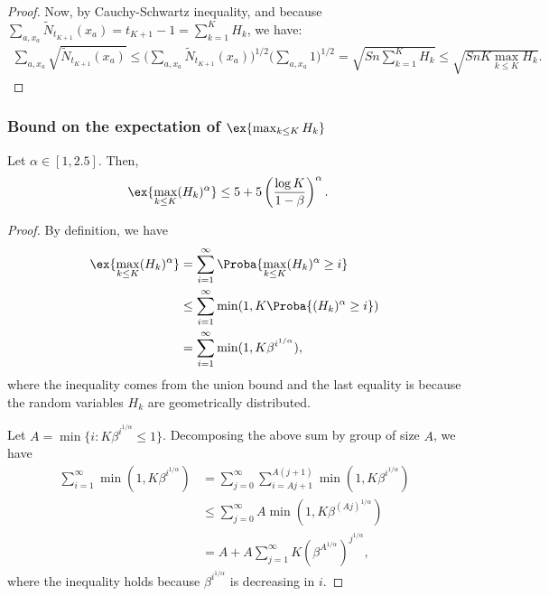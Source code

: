 \begin{subappendices}
\begin{proof}
Now, by Cauchy-Schwartz inequality, and because $\sum_{a,x_a}\tilde{N}_{t_{K+1}}(x_a) =t_{K+1}-1 {=}\sum_{k=1}^{K}H_k$, we have:
\begin{align*}
    \sum_{a,x_a}\sqrt{\tilde{N}_{t_{K+1}}(x_a)} \le \Big(\sum_{a,x_a}\tilde{N}_{t_{K+1}}(x_a)\Big)^{1/2}\Big(\sum_{a,x_a}1\Big)^{1/2}=\sqrt{Sn\sum_{k=1}^{K}H_k}\le \sqrt{SnK \max_{k\le K}H_k}.
\end{align*}
\end{proof}

\subsubsection{Bound on the expectation of $\ex{\max_{k\le K}H_k}$}

\begin{lem}
    \label{lem:moment}
    Let $\alpha\in[1,2.5]$. Then,
    \begin{align}
        \label{eq:lemma_HK}
        \ex{\max_{k\le K}(H_k)^\alpha} &\le 5+5\left(\frac{\log K}{1-\beta}\right)^\alpha.
    \end{align}
 \end{lem}
 \begin{proof}
    By definition, we have
    \begin{align*}
        \ex{\max_{k\le K}(H_k)^\alpha} &=  \sum_{i=1}^\infty \Proba{ \max_{k\le K}(H_k)^\alpha \ge i}\\
        &\le \sum_{i=1}^\infty \min(1, K \Proba{ (H_k)^\alpha \ge i})\\
        &= \sum_{i=1}^\infty \min(1, K \beta^{i^{1/\alpha}}),
    \end{align*}
    where the inequality comes from the union bound and the last equality is because the random variables $H_k$ are geometrically distributed.
 
    Let $A=\min\{i : K \beta^{i^{1/\alpha}}\le 1\}$. Decomposing the above sum by group of size $A$, we have
    \begin{align}
        \sum_{i=1}^\infty \min(1, K \beta^{i^{1/\alpha}})
        &= \sum_{j=0}^\infty \sum_{i=Aj+1}^{A(j+1)}\min(1, K \beta^{i^{1/\alpha}})\nonumber\\
        &\le \sum_{j=0}^\infty A \min(1, K \beta^{(Aj)^{1/\alpha}})\nonumber\\
        &= A + A\sum_{j=1}^\infty K (\beta^{A^{1/\alpha}})^{j^{1/\alpha}},
        \label{eq:sum_A}
    \end{align}
    where the inequality holds because $\beta^{i^{1/\alpha}}$ is decreasing in $i$. 
 

\end{proof}
\end{subappendices}
